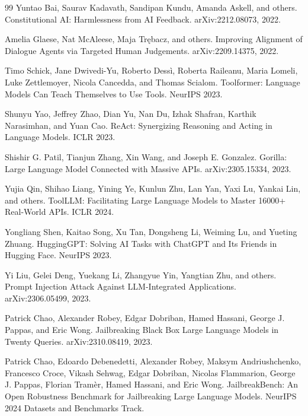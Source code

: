 \documentclass{article}
\begin{document}
\begin{thebibliography}{99}
Yuntao Bai, Saurav Kadavath, Sandipan Kundu, Amanda Askell, and others.
\newblock Constitutional AI: Harmlessness from AI Feedback.
\newblock arXiv:2212.08073, 2022.

Amelia Glaese, Nat McAleese, Maja Tr\k{e}bacz, and others.
\newblock Improving Alignment of Dialogue Agents via Targeted Human Judgements.
\newblock arXiv:2209.14375, 2022.

Timo Schick, Jane Dwivedi-Yu, Roberto Dess\`i, Roberta Raileanu, Maria Lomeli, Luke Zettlemoyer, Nicola Cancedda, and Thomas Scialom.
\newblock Toolformer: Language Models Can Teach Themselves to Use Tools.
\newblock NeurIPS 2023.

Shunyu Yao, Jeffrey Zhao, Dian Yu, Nan Du, Izhak Shafran, Karthik Narasimhan, and Yuan Cao.
\newblock ReAct: Synergizing Reasoning and Acting in Language Models.
\newblock ICLR 2023.

Shishir G. Patil, Tianjun Zhang, Xin Wang, and Joseph E. Gonzalez.
\newblock Gorilla: Large Language Model Connected with Massive APIs.
\newblock arXiv:2305.15334, 2023.

Yujia Qin, Shihao Liang, Yining Ye, Kunlun Zhu, Lan Yan, Yaxi Lu, Yankai Lin, and others.
\newblock ToolLLM: Facilitating Large Language Models to Master 16000+ Real-World APIs.
\newblock ICLR 2024.

Yongliang Shen, Kaitao Song, Xu Tan, Dongsheng Li, Weiming Lu, and Yueting Zhuang.
\newblock HuggingGPT: Solving AI Tasks with ChatGPT and Its Friends in Hugging Face.
\newblock NeurIPS 2023.

Yi Liu, Gelei Deng, Yuekang Li, Zhangyue Yin, Yangtian Zhu, and others.
\newblock Prompt Injection Attack Against LLM-Integrated Applications.
\newblock arXiv:2306.05499, 2023.

Patrick Chao, Alexander Robey, Edgar Dobriban, Hamed Hassani, George J. Pappas, and Eric Wong.
\newblock Jailbreaking Black Box Large Language Models in Twenty Queries.
\newblock arXiv:2310.08419, 2023.

Patrick Chao, Edoardo Debenedetti, Alexander Robey, Maksym Andriushchenko, Francesco Croce, Vikash Sehwag, Edgar Dobriban, Nicolas Flammarion, George J. Pappas, Florian Tram\`er, Hamed Hassani, and Eric Wong.
\newblock JailbreakBench: An Open Robustness Benchmark for Jailbreaking Large Language Models.
\newblock NeurIPS 2024 Datasets and Benchmarks Track.


\end{thebibliography}
\end{document}
